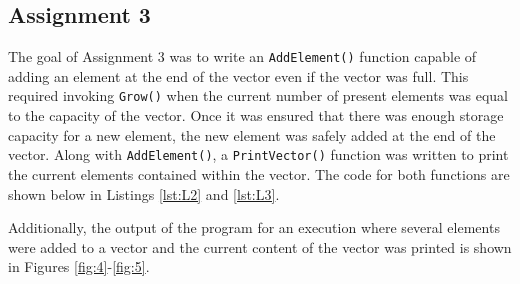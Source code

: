 \documentclass[
	letterpaper, %
	10pt, %
]{CSUniSchoolLabReport}
\begin{document}
\subsection{Assignment 3}

\hspace{.5 in} The goal of Assignment 3 was to write an \texttt{AddElement()} function capable of adding an element at the end of the vector even if the vector was full. This required invoking \texttt{Grow()} when the current number of present elements was equal to the capacity of the vector. Once it was ensured that there was enough storage capacity for a new element, the new element was safely added at the end of the vector. Along with \texttt{AddElement()}, a \texttt{PrintVector()} function was written to print the current elements contained within the vector. The code for both functions are shown below in Listings \ref{lst:L2} and \ref{lst:L3}. 





  Additionally, the output of the program for an execution where several elements were added to a vector and the current content of the vector was printed is shown in Figures \ref{fig:4}-\ref{fig:5}.
\end{document}
